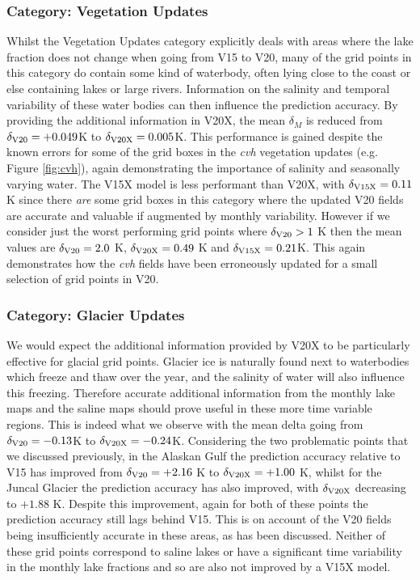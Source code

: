 \documentclass[twocolumn]{article}
\begin{document}
	\subsubsection{Category: Vegetation Updates}
	Whilst the Vegetation Updates category explicitly deals with areas where the lake fraction does not change when going from V15 to V20, many of the grid points in this category do contain some kind of waterbody, often lying close to the coast or else containing lakes or large rivers. Information on the salinity and temporal variability of these water bodies can then  influence the prediction accuracy. By providing the additional information in V20X, the mean $\delta_{M}$ is reduced from $\delta_{\rm V20} = +0.049$K to $\delta_{\rm V20X} =0.005 $K. This performance is gained despite the known errors for some of the grid boxes in the \textit{cvh} vegetation updates (e.g. Figure \ref{fig:cvh}), again demonstrating the importance of salinity and seasonally varying water. The V15X model is less performant than V20X, with $\delta_{\rm V15X} = 0.11$K since there \textit{are} some grid boxes in this category where the updated V20 fields are accurate and valuable if augmented by monthly variability. However if we consider just the worst performing grid points where $\delta_{\rm V20} > 1$ K then the mean values are $\delta_{\rm V20} = 2.0$ K, $\delta_{\rm V20X} = 0.49$ K and $\delta_{\rm V15X} = 0.21$K. This again demonstrates how the \textit{cvh} fields have been erroneously updated for a small selection of grid points in V20. 
	
	
	\subsubsection{Category: Glacier Updates}
	We would expect the additional information provided by V20X to be particularly effective for glacial grid points. Glacier ice is naturally found next to waterbodies which freeze and thaw over the year, and the salinity of water will also influence this freezing. Therefore accurate additional information from the monthly lake maps and the saline maps should prove useful in these more time variable regions. This is indeed what we observe with the mean delta going from $\delta_{\rm V20} = -0.13$K to $\delta_{\rm V20X}= -0.24$K.  Considering the two problematic points that we discussed previously, in the Alaskan Gulf the prediction accuracy relative to V15 has improved from $\delta_{\rm V20} = +2.16$ K to $\delta_{\rm V20X}= +1.00$ K, whilst for the Juncal Glacier the prediction accuracy has also improved, with $\delta_{\rm V20X}$ decreasing to $+1.88$ K. Despite this improvement, again for both of these points the prediction accuracy still lags behind V15. This is on account of the V20 fields being insufficiently accurate in these areas, as has been discussed. Neither of these grid points correspond to saline lakes or have a significant time variability in the monthly lake fractions and so are also not improved by a V15X model.
	
\end{document}
